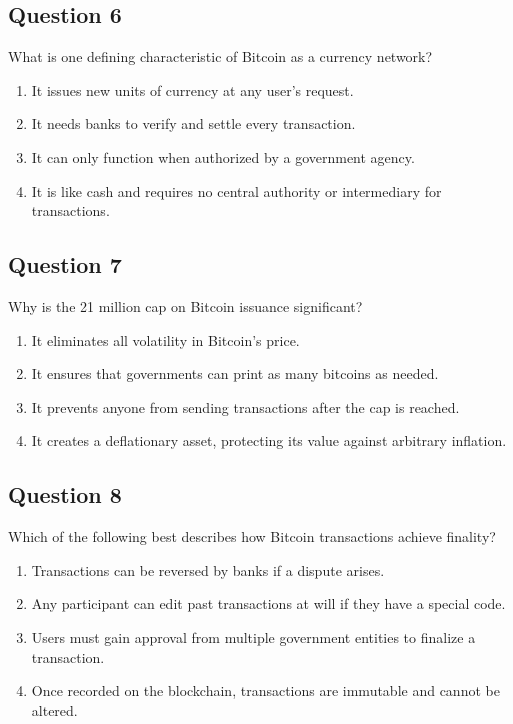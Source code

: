 \documentclass[12pt,a4paper]{article}
\begin{document}
\bigskip


\subsection*{Question 6}
What is one defining characteristic of Bitcoin as a currency network?

\begin{enumerate}[label=\Alph*., leftmargin=*]
\item It issues new units of currency at any user’s request.
\item It needs banks to verify and settle every transaction.
\item It can only function when authorized by a government agency.
\item It is like cash and requires no central authority or intermediary for transactions.
\end{enumerate}

\bigskip


\subsection*{Question 7}
Why is the 21 million cap on Bitcoin issuance significant?

\begin{enumerate}[label=\Alph*., leftmargin=*]
\item It eliminates all volatility in Bitcoin’s price.
\item It ensures that governments can print as many bitcoins as needed.
\item It prevents anyone from sending transactions after the cap is reached.
\item It creates a deflationary asset, protecting its value against arbitrary inflation.
\end{enumerate}

\bigskip


\subsection*{Question 8}
Which of the following best describes how Bitcoin transactions achieve finality?

\begin{enumerate}[label=\Alph*., leftmargin=*]
\item Transactions can be reversed by banks if a dispute arises.
\item Any participant can edit past transactions at will if they have a special code.
\item Users must gain approval from multiple government entities to finalize a transaction.
\item Once recorded on the blockchain, transactions are immutable and cannot be altered.
\end{enumerate}
\end{document}
